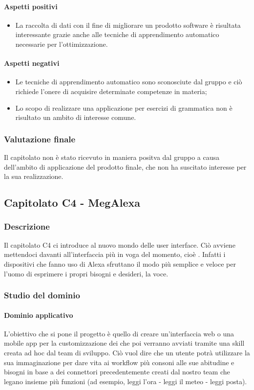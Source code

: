 	\paragraph{Aspetti positivi}
	\begin{itemize}
		\item {La raccolta di dati con il fine di migliorare un prodotto software è risultata interessante grazie anche alle tecniche di apprendimento automatico necessarie per l'ottimizzazione.}
	\end{itemize} 
	\paragraph{Aspetti negativi} 
	\begin{itemize}
		\item {Le tecniche di apprendimento automatico sono sconosciute dal gruppo e ciò richiede l'onere di acquisire determinate competenze in materia;}
		\item {Lo scopo di realizzare una applicazione per esercizi di grammatica non è risultato un ambito di interesse comune.}
	\end{itemize} 
	\subsubsection{Valutazione finale}
	Il capitolato non è stato ricevuto in maniera positva dal gruppo a causa dell'ambito di applicazione del prodotto finale, che non ha suscitato interesse per la sua realizzazione.
	
	\subsection{Capitolato C4 - MegAlexa}
	\subsubsection{Descrizione}	
		Il capitolato C4 ci introduce al nuovo mondo delle user interface. Ciò avviene mettendoci davanti all’interfaccia più in voga del momento, cioè . Infatti i dispositivi che fanno uso di Alexa sfruttano il modo più semplice e veloce per l’uomo di esprimere i propri bisogni e desideri, la voce. 
	\subsubsection{Studio del dominio}
	
	\paragraph{Dominio applicativo} \Spazio
     L’obiettivo che si pone il progetto è quello di creare un’interfaccia web o una mobile app per la customizzazione dei  che poi verranno avviati tramite una skill creata ad hoc dal team di sviluppo.
     Ciò vuol dire che un utente potrà utilizzare la sua immaginazione per dare vita ai workflow più consoni alle sue abitudine e bisogni in base a dei connettori precedentemente creati dal nostro team che legano insieme più funzioni (ad esempio, leggi l'ora - leggi il meteo - leggi posta).
